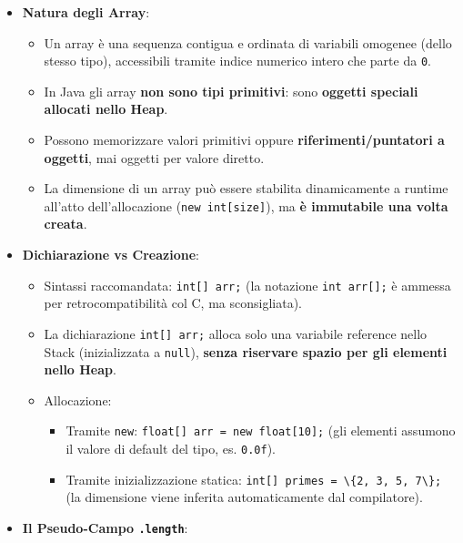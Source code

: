\documentclass[11pt,a4paper]{article}
\newcommand{\passthrough}[1]{#1}
\providecommand{\tightlist}{\setlength{\itemsep}{0pt}\setlength{\parskip}{0pt}}
\begin{document}
\begin{itemize}
\item
  \textbf{Natura degli Array}:

  \begin{itemize}
  \tightlist
  \item
    Un array è una sequenza contigua e ordinata di variabili omogenee
    (dello stesso tipo), accessibili tramite indice numerico intero che
    parte da \passthrough{\lstinline!0!}.
  \item
    In Java gli array \textbf{non sono tipi primitivi}: sono
    \textbf{oggetti speciali allocati nello Heap}.
  \item
    Possono memorizzare valori primitivi oppure
    \textbf{riferimenti/puntatori a oggetti}, mai oggetti per valore
    diretto.
  \item
    La dimensione di un array può essere stabilita dinamicamente a
    runtime all'atto dell'allocazione
    (\passthrough{\lstinline!new int[size]!}), ma \textbf{è immutabile
    una volta creata}.
  \end{itemize}
\item
  \textbf{Dichiarazione vs Creazione}:

  \begin{itemize}
  \tightlist
  \item
    Sintassi raccomandata: \passthrough{\lstinline!int[] arr;!} (la
    notazione \passthrough{\lstinline!int arr[];!} è ammessa per
    retrocompatibilità col C, ma sconsigliata).
  \item
    La dichiarazione \passthrough{\lstinline!int[] arr;!} alloca solo
    una variabile reference nello Stack (inizializzata a
    \passthrough{\lstinline!null!}), \textbf{senza riservare spazio per
    gli elementi nello Heap}.
  \item
    Allocazione:

    \begin{itemize}
    \tightlist
    \item
      Tramite \passthrough{\lstinline!new!}:
      \passthrough{\lstinline!float[] arr = new float[10];!} (gli
      elementi assumono il valore di default del tipo, es.
      \passthrough{\lstinline!0.0f!}).
    \item
      Tramite inizializzazione statica:
      \passthrough{\lstinline!int[] primes = \{2, 3, 5, 7\};!} (la
      dimensione viene inferita automaticamente dal compilatore).
    \end{itemize}
  \end{itemize}
\item
  \textbf{Il Pseudo-Campo \passthrough{\lstinline!.length!}}:


\end{itemize}
\end{document}
